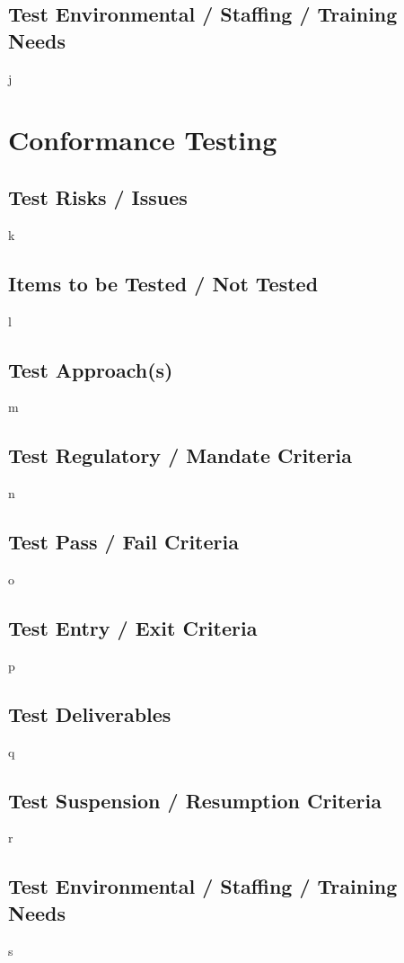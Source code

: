 \documentclass{article}
\begin{document}
\subsection{Test Environmental / Staffing / Training Needs}
j

\section{Conformance Testing}
\subsection{Test Risks / Issues}
k

\subsection{Items to be Tested / Not Tested}
l 

\subsection{Test Approach(s)}
m 

\subsection{Test Regulatory / Mandate Criteria}
n

\subsection{Test Pass / Fail Criteria}
o

\subsection{Test Entry / Exit Criteria}
p

\subsection{Test Deliverables}
q

\subsection{Test Suspension / Resumption Criteria}
r

\subsection{Test Environmental / Staffing / Training Needs}
s
\end{document}

